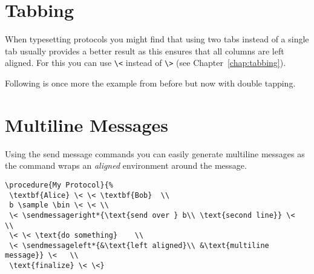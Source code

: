 \documentclass[a4paper]{report}
\begin{document}
\section{Tabbing}
When typesetting protocols you might find that using two tabs instead of a single tab usually provides
a better result as this ensures that all columns are left aligned.
For this you can use \lstinline$\<$ instead of \lstinline$\>$ (see Chapter~\ref{chap:tabbing}).

Following is once more the example from before but now with double tapping.
\begin{center}
\end{center}

\section{Multiline Messages}
Using the send message commands you can easily generate multiline messages as the command
wraps an \emph{aligned} environment around the message.
\begin{center}
\end{center}
\begin{lstlisting}
\procedure{My Protocol}{%
 \textbf{Alice} \< \< \textbf{Bob}  \\
 b \sample \bin \< \< \\
 \< \sendmessageright*{\text{send over } b\\ \text{second line}} \<  \\
 \< \< \text{do something}    \\
 \< \sendmessageleft*{&\text{left aligned}\\ &\text{multiline message}} \<   \\
 \text{finalize} \< \<}
\end{lstlisting}
\end{document}
